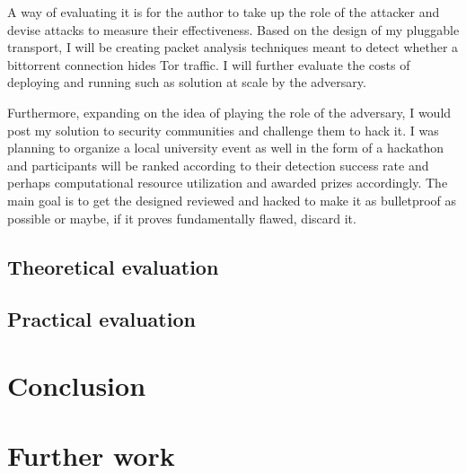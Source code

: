\documentclass[11pt]{article} %
\begin{document}
A way of evaluating it is for the author to take up the role of the attacker and devise attacks to measure their effectiveness. Based on the design of my pluggable transport, I will be creating packet analysis techniques meant to detect whether a bittorrent connection hides Tor traffic. I will further evaluate the costs of deploying and running such as solution at scale by the adversary. 

Furthermore, expanding on the idea of playing the role of the adversary, I would post my solution to security communities and challenge them to hack it. I was planning to organize a local university event as well in the form of a hackathon and participants will be ranked according to their detection success rate and perhaps computational resource utilization and awarded prizes accordingly. The main goal is to get the designed reviewed and hacked to make it as bulletproof as possible or maybe, if it proves fundamentally flawed, discard it.

\subsection{Theoretical evaluation}

\subsection{Practical evaluation}

\section{Conclusion}

\section{Further work}




\newpage

\end{document}
